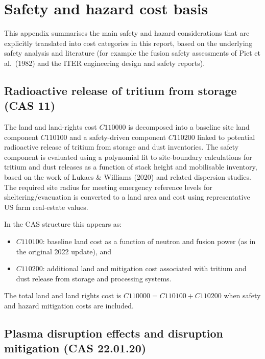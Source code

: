 \ifsafetycosts
\section{Safety and hazard cost basis}

This appendix summarises the main safety and hazard considerations that are
explicitly translated into cost categories in this report, based on the
underlying safety analysis and literature (for example the fusion safety
assessments of Piet et al.\ (1982)\cite{Piet1982Potential} and the ITER
engineering design and safety reports\cite{iter2001final,baylor2019shattered}).

\subsection{Radioactive release of tritium from storage (CAS 11)}

The land and land-rights cost \(C110000\) is decomposed into a baseline
site land component \(C110100\) and a safety-driven component
\(C110200\) linked to potential radioactive release of tritium from
storage and dust inventories. The safety component is evaluated using a
polynomial fit to site-boundary calculations for tritium and dust
releases as a function of stack height and mobilisable inventory, based
on the work of Lukacs \& Williams (2020) and related dispersion
studies. The required site radius for meeting emergency reference levels
for sheltering/evacuation is converted to a land area and cost using
representative US farm real-estate values\cite{USDA2022LandValues}.

In the CAS structure this appears as:
\begin{itemize}
  \item \(C110100\): baseline land cost as a function of neutron and
        fusion power (as in the original 2022 update), and
  \item \(C110200\): additional land and mitigation cost associated
        with tritium and dust release from storage and processing
        systems.
\end{itemize}
The total land and land rights cost is \(C110000 = C110100 + C110200\)
when safety and hazard mitigation costs are included.

\subsection{Plasma disruption effects and disruption mitigation (CAS 22.01.20)}

